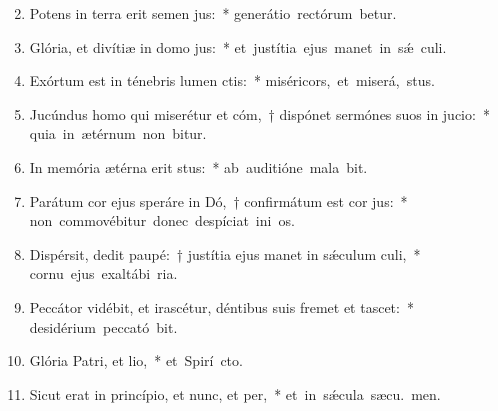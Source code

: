\begin{flushleft}
\begin{enumerate}[leftmargin=*]
\setcounter{enumi}{1}

\item Potens in terra erit semen jus:~* \mbox{generátio rectórum betur.}

\item Glória, et divítiæ in domo jus:~* \mbox{et justítia ejus manet in s\'{\ae} culi.}

\item Exórtum est in ténebris lumen ctis:~* \mbox{miséricors, et miserá,  stus.}

\item Jucúndus homo qui miserétur et cóm,~† dispónet sermónes suos in jucio:~* \mbox{quia in ætérnum non bitur.}

\item In memória ætérna erit stus:~* \mbox{ab auditióne mala  bit.}

\item Parátum cor ejus speráre in Dó,~† confirmátum est cor jus:~* \mbox{non commovébitur donec despíciat ini os.}

\item Dispérsit, dedit paupé:~† justítia ejus manet in s\'{\ae}culum culi,~* \mbox{cornu ejus exaltábi  ria.}

\item Peccátor vidébit, et irascétur, déntibus suis fremet et tascet:~* \mbox{desidérium peccató bit.}

\item Glória Patri, et lio,~* \mbox{et Spirí cto.}

\item Sicut erat in princípio, et nunc, et per,~* \mbox{et in s\'{\ae}cula sæcu. men.}


\end{enumerate}
\end{flushleft}

